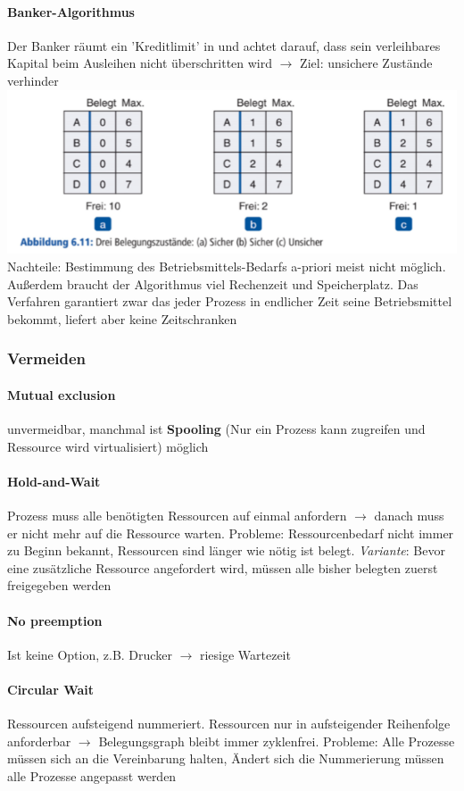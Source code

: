 \documentclass[10pt,a4paper,landscape]{article}
\begin{document}
\begin{multicols*}{3}
	\paragraph{Banker-Algorithmus} Der Banker räumt ein 'Kreditlimit' in und achtet darauf, dass sein verleihbares Kapital beim Ausleihen nicht überschritten wird $\rightarrow$ Ziel: unsichere Zustände verhinder\\
	\includegraphics[width=0.9\columnwidth]{banker}
	Nachteile: Bestimmung des Betriebsmittels-Bedarfs a-priori meist nicht möglich. Außerdem braucht der Algorithmus viel Rechenzeit und Speicherplatz. Das Verfahren garantiert zwar das jeder Prozess in endlicher Zeit seine Betriebsmittel bekommt, liefert aber keine Zeitschranken
	\subsubsection{Vermeiden}
	\paragraph{Mutual exclusion} unvermeidbar, manchmal ist \textbf{Spooling} (Nur ein Prozess kann zugreifen und Ressource wird virtualisiert) möglich
	\paragraph{Hold-and-Wait} Prozess muss alle benötigten Ressourcen auf einmal anfordern $\rightarrow$ danach muss er nicht mehr auf die Ressource warten. Probleme: Ressourcenbedarf nicht immer zu Beginn bekannt, Ressourcen sind länger wie nötig ist belegt. \textit{Variante}: Bevor eine zusätzliche Ressource angefordert wird, müssen alle bisher belegten zuerst freigegeben werden
	\paragraph{No preemption} Ist keine Option, z.B. Drucker $\rightarrow$ riesige Wartezeit
	\paragraph{Circular Wait} Ressourcen aufsteigend nummeriert. Ressourcen nur in aufsteigender Reihenfolge anforderbar $\rightarrow$ Belegungsgraph bleibt immer zyklenfrei. Probleme: Alle Prozesse müssen sich an die Vereinbarung halten, Ändert sich die Nummerierung müssen alle Prozesse angepasst werden

\end{multicols*}
\end{document}
